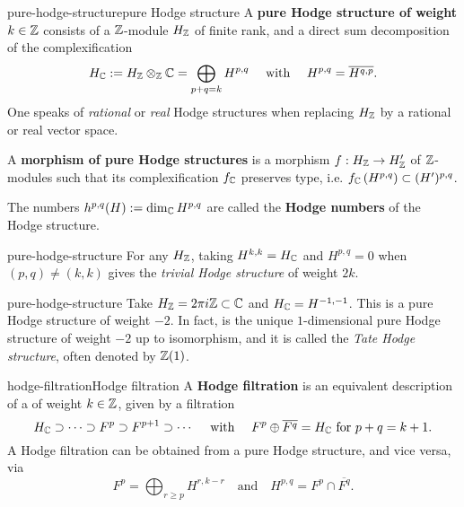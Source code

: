 \begin{topic}{pure-hodge-structure}{pure Hodge structure}
    A \textbf{pure Hodge structure of weight $k \in \mathbb{Z}$} consists of a $\mathbb{Z}$-module $H_{\mathbb{Z}}$ of finite rank, and a direct sum decomposition of the complexification
    \[ H_{\mathbb{C}} := H_{\mathbb{Z}} \otimes_{\mathbb{Z}} \mathbb{C} = \bigoplus_{p + q = k} H^{p, q} \quad \text{ with } \quad H^{p, q} = \overline{H^{q, p}} . \]
    One speaks of \textit{rational} or \textit{real} Hodge structures when replacing $H_{\mathbb{Z}}$ by a rational or real vector space.
    
    A \textbf{morphism of pure Hodge structures} is a morphism $f : H_{\mathbb{Z}} \to H'_{\mathbb{Z}}$ of $\mathbb{Z}$-modules such that its complexification $f_{\mathbb{C}}$ preserves type, i.e. $f_{\mathbb{C}}\left(H^{p, q}\right) \subset (H')^{p, q}$.
    
    The numbers $h^{p, q}(H) := \dim_{\mathbb{C}} H^{p, q}$ are called the \textbf{Hodge numbers} of the Hodge structure.
\end{topic}

\begin{example}{pure-hodge-structure}
    For any $H_{\mathbb{Z}}$, taking $H^{k,k} = H_{\mathbb{C}}$ and $H^{p, q} = 0$ when $(p, q) \ne (k, k)$ gives the \textit{trivial Hodge structure} of weight $2k$.
\end{example}

\begin{example}{pure-hodge-structure}
    Take $H_{\mathbb{Z}} = 2 \pi i \mathbb{Z} \subset \mathbb{C}$ and $H_{\mathbb{C}} = H^{-1, -1}$. This is a pure Hodge structure of weight $-2$. In fact, is the unique $1$-dimensional pure Hodge structure of weight $-2$ up to isomorphism, and it is called the \textit{Tate Hodge structure}, often denoted by $\mathbb{Z}(1)$.
\end{example}

\begin{topic}{hodge-filtration}{Hodge filtration}
    A \textbf{Hodge filtration} is an equivalent description of a  of weight $k \in \mathbb{Z}$, given by a filtration
    \[ H_{\mathbb{C}} \supset \cdots \supset F^p \supset F^{p + 1} \supset \cdots \quad \text{ with } \quad F^p \oplus \overline{F^q} = H_{\mathbb{C}} \text{ for } p + q = k + 1 . \]
    A Hodge filtration can be obtained from a pure Hodge structure, and vice versa, via
    \[ F^p = \bigoplus_{r \ge p} H^{r, k - r} \quad \text{and} \quad H^{p, q} = F^p \cap \overline{F^q} . \]
\end{topic}

